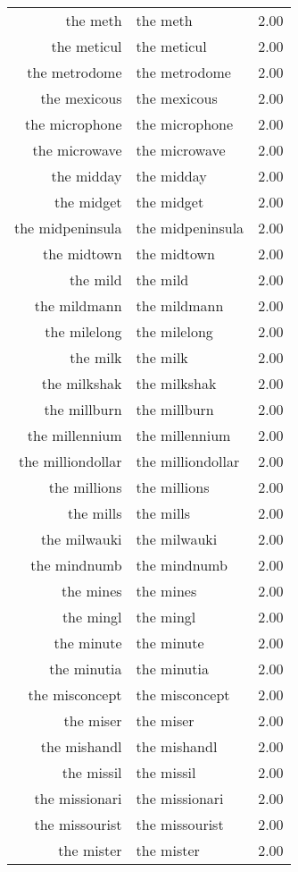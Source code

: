 \begin{table}[ht]
\begin{tabular}{rlr}
  the meth & the meth & 2.00 \\ 
  the meticul & the meticul & 2.00 \\ 
  the metrodome & the metrodome & 2.00 \\ 
  the mexicous & the mexicous & 2.00 \\ 
  the microphone & the microphone & 2.00 \\ 
  the microwave & the microwave & 2.00 \\ 
  the midday & the midday & 2.00 \\ 
  the midget & the midget & 2.00 \\ 
  the midpeninsula & the midpeninsula & 2.00 \\ 
  the midtown & the midtown & 2.00 \\ 
  the mild & the mild & 2.00 \\ 
  the mildmann & the mildmann & 2.00 \\ 
  the milelong & the milelong & 2.00 \\ 
  the milk & the milk & 2.00 \\ 
  the milkshak & the milkshak & 2.00 \\ 
  the millburn & the millburn & 2.00 \\ 
  the millennium & the millennium & 2.00 \\ 
  the milliondollar & the milliondollar & 2.00 \\ 
  the millions & the millions & 2.00 \\ 
  the mills & the mills & 2.00 \\ 
  the milwauki & the milwauki & 2.00 \\ 
  the mindnumb & the mindnumb & 2.00 \\ 
  the mines & the mines & 2.00 \\ 
  the mingl & the mingl & 2.00 \\ 
  the minute & the minute & 2.00 \\ 
  the minutia & the minutia & 2.00 \\ 
  the misconcept & the misconcept & 2.00 \\ 
  the miser & the miser & 2.00 \\ 
  the mishandl & the mishandl & 2.00 \\ 
  the missil & the missil & 2.00 \\ 
  the missionari & the missionari & 2.00 \\ 
  the missourist & the missourist & 2.00 \\ 
  the mister & the mister & 2.00 \\ 

\end{tabular}
\end{table}
